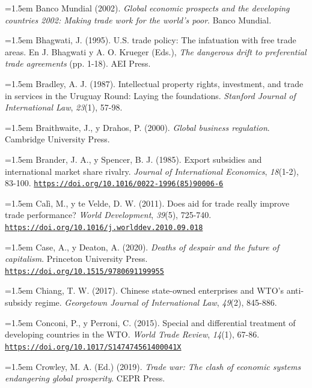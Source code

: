 \documentclass[10pt,a4paper]{article}
\begin{document}
\noindent\hangindent=1.5em Banco Mundial (2002). \textit{Global economic prospects and the developing countries 2002: Making trade work for the world's poor}. Banco Mundial.

\noindent\hangindent=1.5em Bhagwati, J. (1995). U.S. trade policy: The infatuation with free trade areas. En J. Bhagwati y A. O. Krueger (Eds.), \textit{The dangerous drift to preferential trade agreements} (pp. 1-18). AEI Press.

\noindent\hangindent=1.5em Bradley, A. J. (1987). Intellectual property rights, investment, and trade in services in the Uruguay Round: Laying the foundations. \textit{Stanford Journal of International Law}, \textit{23}(1), 57-98.

\noindent\hangindent=1.5em Braithwaite, J., y Drahos, P. (2000). \textit{Global business regulation}. Cambridge University Press.

\noindent\hangindent=1.5em Brander, J. A., y Spencer, B. J. (1985). Export subsidies and international market share rivalry. \textit{Journal of International Economics}, \textit{18}(1-2), 83-100. \href{https://doi.org/10.1016/0022-1996(85)90006-6}{\nolinkurl{https://doi.org/10.1016/0022-1996(85)90006-6}}

\noindent\hangindent=1.5em Calì, M., y te Velde, D. W. (2011). Does aid for trade really improve trade performance? \textit{World Development}, \textit{39}(5), 725-740. \href{https://doi.org/10.1016/j.worlddev.2010.09.018}{\nolinkurl{https://doi.org/10.1016/j.worlddev.2010.09.018}}

\noindent\hangindent=1.5em Case, A., y Deaton, A. (2020). \textit{Deaths of despair and the future of capitalism}. Princeton University Press. \href{https://doi.org/10.1515/9780691199955}{\nolinkurl{https://doi.org/10.1515/9780691199955}}

\noindent\hangindent=1.5em Chiang, T. W. (2017). Chinese state-owned enterprises and WTO's anti-subsidy regime. \textit{Georgetown Journal of International Law}, \textit{49}(2), 845-886.

\noindent\hangindent=1.5em Conconi, P., y Perroni, C. (2015). Special and differential treatment of developing countries in the WTO. \textit{World Trade Review}, \textit{14}(1), 67-86. \href{https://doi.org/10.1017/S147474561400041X}{\nolinkurl{https://doi.org/10.1017/S147474561400041X}}

\noindent\hangindent=1.5em Crowley, M. A. (Ed.) (2019). \textit{Trade war: The clash of economic systems endangering global prosperity}. CEPR Press.
\end{document}
